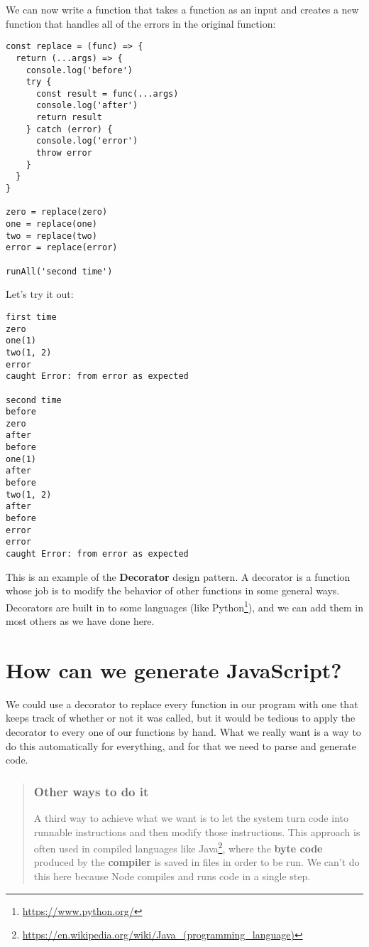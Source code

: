 \documentclass[krantzl]{krantz}
\newcommand{\glossref}[1]{\textbf{#1}}
\newenvironment{callout}{\savenotes\begin{tBox}\begin{quotation}\toggletrue{inbox}\renewcommand{\thempfootnote}{\arabic{footnote}}}{\end{quotation}\vspace{\baselineskip}\end{tBox}\togglefalse{inbox}\spewnotes}
\newcommand{\hreffoot}[2]{{#1}\footnote{\href{#2}{#2}}}
\begin{document}
We can now write a function that takes a function as an input
and creates a new function that handles all of the errors in the original function:


\begin{lstlisting}[frame=tblr]
const replace = (func) => {
  return (...args) => {
    console.log('before')
    try {
      const result = func(...args)
      console.log('after')
      return result
    } catch (error) {
      console.log('error')
      throw error
    }
  }
}

zero = replace(zero)
one = replace(one)
two = replace(two)
error = replace(error)

runAll('second time')
\end{lstlisting}



Let’s try it out:


\begin{lstlisting}[frame=tblr,backgroundcolor=\color{black!5}]
first time
zero
one(1)
two(1, 2)
error
caught Error: from error as expected

second time
before
zero
after
before
one(1)
after
before
two(1, 2)
after
before
error
error
caught Error: from error as expected
\end{lstlisting}



This is an example of the \glossref{Decorator} design pattern.
A decorator is a function whose job is to modify the behavior of other functions
in some general ways.
Decorators are built in to some languages (like \hreffoot{Python}{https://www.python.org/}),
and we can add them in most others as we have done here.

\section{How can we generate JavaScript?}\label{code-generator-generate}


We could use a decorator to replace every function in our program
with one that keeps track of whether or not it was called,
but it would be tedious to apply the decorator to every one of our functions by hand.
What we really want is a way to do this automatically for everything,
and for that we need to parse and generate code.

\begin{callout}


\subsubsection*{Other ways to do it}


A third way to achieve what we want is
to let the system turn code into runnable instructions
and then modify those instructions.
This approach is often used in compiled languages like \hreffoot{Java}{https://en.wikipedia.org/wiki/Java\_(programming\_language)},
where the \glossref{byte code} produced by the \glossref{compiler} is saved in files
in order to be run.
We can’t do this here because Node compiles and runs code in a single step.

\end{callout}
\end{document}
